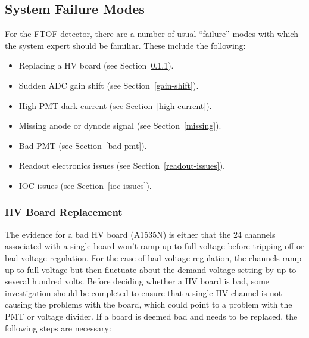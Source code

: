 \documentclass[12pt]{article}
\begin{document}
\clearpage

\vfil
\eject

\subsection{System Failure Modes}
\label{repairs}

For the FTOF detector, there are a number of usual ``failure'' modes with which the system expert should
be familiar. These include the following:

\begin{itemize}
\item Replacing a HV board (see Section~\ref{board-swap}).
\item Sudden ADC gain shift (see Section~\ref{gain-shift}).
\item High PMT dark current (see Section~\ref{high-current}).
\item Missing anode or dynode signal (see Section~\ref{missing}).
\item Bad PMT (see Section~\ref{bad-pmt}).
\item Readout electronics issues (see Section~\ref{readout-issues}).
\item IOC issues (see Section~\ref{ioc-issues}).
\end{itemize}

\subsubsection{HV Board Replacement}
\label{board-swap}

The evidence for a bad HV board (A1535N) is either that the 24 channels associated with a single 
board won't ramp up to full voltage before tripping off or bad voltage regulation. For the case
of bad voltage regulation, the channels ramp up to full voltage but then fluctuate about the demand 
voltage setting by up to several hundred volts. Before deciding whether a HV board is bad, some
investigation should be completed to ensure that a single HV channel is not causing the problems
with the board, which could point to a problem with the PMT or voltage divider. If a board is deemed 
bad and needs to be replaced, the following steps are necessary:
\end{document}
